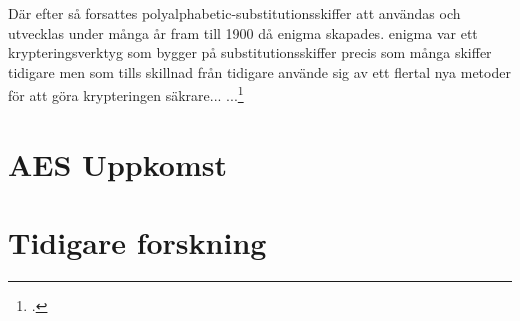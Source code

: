 Där efter så forsattes \gls{polyalphabetic-substitutionsskiffer} att användas och utvecklas
under många år fram till 1900 då \gls{enigma} skapades. \gls{enigma} var ett krypteringsverktyg som
bygger på \gls{substitutionsskiffer} precis som många skiffer tidigare men som tills skillnad från tidigare
använde sig av ett flertal nya metoder för att göra krypteringen säkrare...
...\footcite{kryptografi-historia-1}

\section{AES Uppkomst} %
\label{sec:aes-uppkomst}

\section{Tidigare forskning} %
\label{sec:tidigare-forskning}

